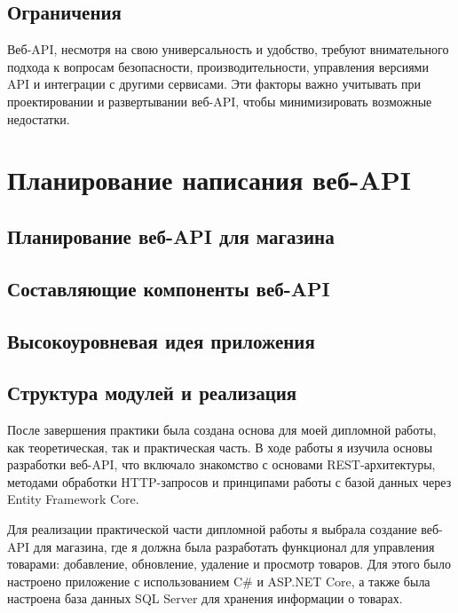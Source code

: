 \documentclass[a4paper,12pt]{report}
\begin{document}
\subsection{Ограничения}

Веб-\ac{API}, несмотря на свою универсальность и удобство, требуют внимательного подхода к вопросам безопасности, 
производительности, управления версиями \ac{API} и интеграции с другими сервисами. Эти факторы важно учитывать 
при проектировании и развертывании веб-\ac{API}, чтобы минимизировать возможные недостатки.







\section{Планирование написания веб-\ac{API}}

\subsection{Планирование веб-\ac{API} для магазина}
\subsection{Составляющие компоненты веб-\ac{API}}
\subsection{Высокоуровневая идея приложения}
\subsection{Структура модулей и реализация}







После завершения практики была создана основа для моей дипломной работы, как теоретическая, так и практическая часть. 
В ходе работы я изучила основы разработки веб-\ac{API}, что включало знакомство с основами \ac{REST}-архитектуры, методами обработки 
\ac{HTTP}-запросов и принципами работы с базой данных через Entity Framework Core.

Для реализации практической части дипломной работы я выбрала создание веб-\ac{API} для магазина, где я должна была разработать 
функционал для управления товарами: добавление, обновление, удаление и просмотр товаров. Для этого было настроено приложение 
с использованием C\# и ASP.NET Core, а также была настроена база данных \ac{SQL} Server для хранения информации о товарах.
\end{document}

